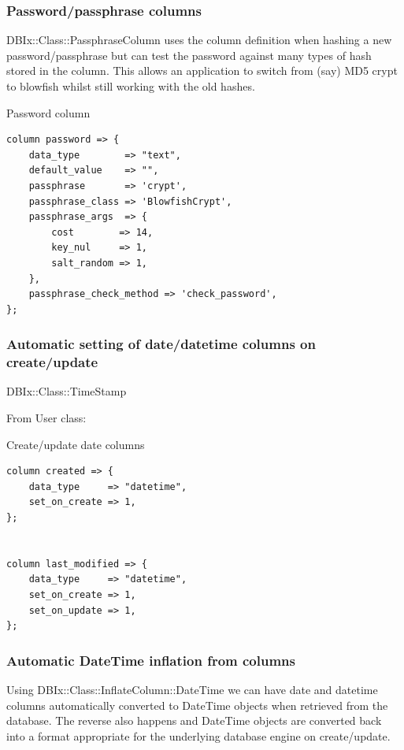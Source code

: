 \subsubsection{Password/passphrase columns}

DBIx::Class::PassphraseColumn uses the column definition when hashing a new
password/passphrase but can test the password against many types of hash
stored in the column. This allows an application to switch from (say)
MD5 crypt to blowfish whilst still working with the old hashes.

\begin{frame}[fragile]{Password column}
\begin{lstlisting}
column password => {
    data_type        => "text",
    default_value    => "",
    passphrase       => 'crypt',
    passphrase_class => 'BlowfishCrypt',
    passphrase_args  => {
        cost        => 14,
        key_nul     => 1,
        salt_random => 1,
    },
    passphrase_check_method => 'check_password',
};
\end{lstlisting}
\end{frame}

\subsubsection{Automatic setting of date/datetime columns on create/update}
DBIx::Class::TimeStamp

From User class:

\begin{frame}[fragile]{Create/update date columns}
\begin{lstlisting}
column created => {
    data_type     => "datetime",
    set_on_create => 1,
};


column last_modified => {
    data_type     => "datetime",
    set_on_create => 1,
    set_on_update => 1,
};
\end{lstlisting}
\end{frame}

\subsubsection{Automatic DateTime inflation from columns}

Using DBIx::Class::InflateColumn::DateTime we can have date and datetime
columns automatically converted to DateTime objects when retrieved from the
database. The reverse also happens and DateTime objects are converted back
into a format appropriate for the underlying database engine on
create/update.

